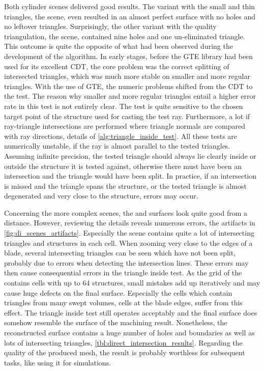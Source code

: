 Both cylinder scenes delivered good results.
The variant with the small and thin triangles, \ie the \cylinders scene, even resulted in an almost perfect surface with no holes and no leftover triangles.
Surprisingly, the other variant with the quality triangulation, \ie the \cylindersd scene, contained nine holes and one un-eliminated triangle.
This outcome is quite the opposite of what had been observed during the development of the algorithm.
In early stages, before the GTE library had been used for its excellent CDT, the core problem was the correct splitting of intersected triangles, which was much more stable on smaller and more regular triangles.
With the use of GTE, the numeric problems shifted from the CDT to the  test.
The reason why smaller and more regular triangles entail a higher error rate in this test is not entirely clear.
The test is quite sensitive to the chosen target point of the structure used for casting the test ray.
Furthermore, a lot if ray-triangle intersections are performed where triangle normals are compared with ray directions, \cf details of \cref{alg:triangle_inside_test}.
All these tests are numerically unstable, if the ray is almost parallel to the tested triangles.
Assuming infinite precision, the tested triangle should always lie clearly inside or outside the structure it is tested against, otherwise there must have been an intersection and the triangle would have been split.
In practice, if an intersection is missed and the triangle spans the structure, or the tested triangle is almost degenerated and very close to the structure, errors may occur.

Concerning the more complex scenes, the \impeller and \turbine surfaces look quite good from a distance.
However, reviewing the details reveals numerous errors, \cf the artifacts in \cref{fig:di_scenes_artifacts}.
Especially the \impeller scene contains quite a lot of intersecting triangles and structures in each cell.
When zooming very close to the edges of a blade, several intersecting triangles can be seen which have not been split, probably due to errors when detecting the intersection lines.
These errors may then cause consequential errors in \eg the triangle inside test.
As the grid of the \impeller contains cells with up to 64 structures, small mistakes add up iteratively and may cause huge defects on the final surface.
Especially the cells which contain triangles from many swept volumes, \ie cells at the blade edges, suffer from this effect.
The triangle inside test still operates acceptably and the final surface does somehow resemble the surface of the machining result.
Nonetheless, the reconstructed surface contains a huge number of holes and boundaries as well as lots of intersecting triangles, \cf \cref{tbl:direct_intersection_results}.
Regarding the quality of the produced mesh, the result is probably worthless for subsequent tasks, like using it for simulations.

